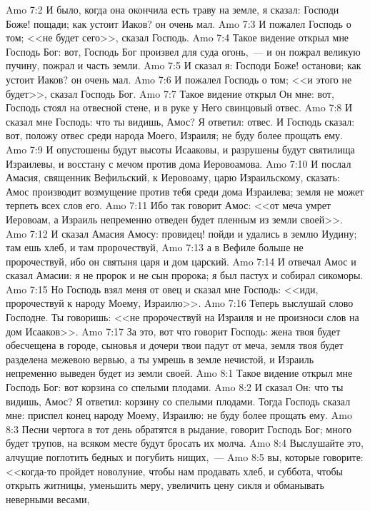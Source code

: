 \vs Amo 7:2 И было, когда она окончила есть траву на земле, я сказал: Господи Боже! пощади; как устоит Иаков? он очень мал.
\vs Amo 7:3 И пожалел Господь о том; <<не будет сего>>, сказал Господь.
\rsbpar\vs Amo 7:4 Такое видение открыл мне Господь Бог: вот, Господь Бог произвел для суда огонь,~--- и он пожрал великую пучину, пожрал и часть земли.
\vs Amo 7:5 И сказал я: Господи Боже! останови; как устоит Иаков? он очень мал.
\vs Amo 7:6 И пожалел Господь о том; <<и этого не будет>>, сказал Господь Бог.
\rsbpar\vs Amo 7:7 Такое видение открыл Он мне: вот, Господь стоял на отвесной стене, и в руке у Него свинцовый отвес.
\vs Amo 7:8 И сказал мне Господь: что ты видишь, Амос? Я ответил: отвес. И Господь сказал: вот, положу отвес среди народа Моего, Израиля; не буду более прощать ему.
\vs Amo 7:9 И опустошены будут  высоты Исааковы, и разрушены будут святилища Израилевы, и восстану с мечом против дома Иеровоамова.
\rsbpar\vs Amo 7:10 И послал Амасия, священник Вефильский, к Иеровоаму, царю Израильскому, сказать: Амос производит возмущение против тебя среди дома Израилева; земля не может терпеть всех слов его.
\vs Amo 7:11 Ибо так говорит Амос: <<от меча умрет Иеровоам, а Израиль непременно отведен будет пленным из земли своей>>.
\vs Amo 7:12 И сказал Амасия Амосу: провидец! пойди и удались в землю Иудину; там ешь хлеб, и там пророчествуй,
\vs Amo 7:13 а в Вефиле больше не пророчествуй, ибо он святыня царя и дом царский.
\vs Amo 7:14 И отвечал Амос и сказал Амасии: я не пророк и не сын пророка; я был пастух и собирал сикоморы.
\vs Amo 7:15 Но Господь взял меня от овец и сказал мне Господь: <<иди, пророчествуй к народу Моему, Израилю>>.
\vs Amo 7:16 Теперь выслушай слово Господне. Ты говоришь: <<не пророчествуй на Израиля и не произноси слов на дом Исааков>>.
\vs Amo 7:17 За это, вот что говорит Господь: жена твоя будет обесчещена в городе, сыновья и дочери твои падут от меча, земля твоя будет разделена межевою вервью, а ты умрешь в земле нечистой, и Израиль непременно выведен будет из земли своей.
\vs Amo 8:1 Такое видение открыл мне Господь Бог: вот корзина со спелыми плодами.
\vs Amo 8:2 И сказал Он: что ты видишь, Амос? Я ответил: корзину со спелыми плодами. Тогда Господь сказал мне: приспел конец народу Моему, Израилю: не буду более прощать ему.
\vs Amo 8:3 Песни чертога в тот день обратятся в рыдание, говорит Господь Бог; много будет трупов, на всяком месте будут бросать их молча.
\rsbpar\vs Amo 8:4 Выслушайте это, алчущие поглотить бедных и погубить нищих,~---
\vs Amo 8:5 вы, которые говорите: <<когда-то пройдет новолуние, чтобы нам продавать хлеб, и суббота, чтобы открыть житницы, уменьшить меру, увеличить цену сикля и обманывать неверными весами,
